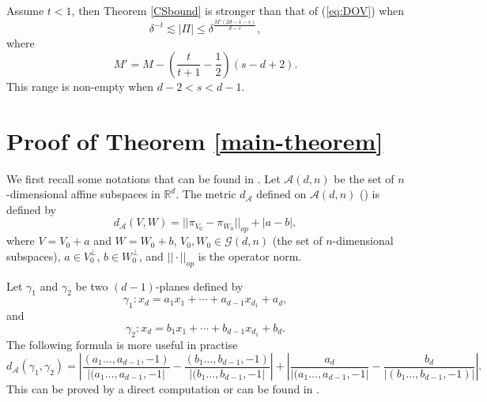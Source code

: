 \documentclass[11pt]{article}
\newcommand{\1}{\mathbf{1}}
\begin{document}
Assume $t<1$, then Theorem \ref{CSbound} is stronger than that of (\ref{eq:DOV}) when 
\[\delta^{-t}\lesssim |\Pi|\le \delta^{\frac{M'(2d-1-s)}{d-s}},\]
where 
\[M'=M-\left(\frac{t}{t+1}-\frac{1}{2}\right)(s-d+2).\]
This range is non-empty when $ d-2<s<d-1$.









\section{Proof of Theorem \ref{main-theorem}}
We first recall some notations that can be found in \cite{DOV}. Let $\mathcal{A}(d, n)$ be the set of $n$-dimensional affine subspaces in $\mathbb{R}^d$. The metric $d_{\mathcal{A}}$ defined on $\mathcal{A}(d, n)$ (\cite[page 53]{M95}) is defined by 
\[d_{\mathcal{A}}(V, W)=||\pi_{V_0}-\pi_{W_0}||_{op}+|a-b|,\]
where $V=V_0+a$ and $W=W_0+b$, $V_0, W_0\in \mathcal{G}(d, n)$ (the set of $n$-dimensional subspaces), $a\in V_0^\perp$, $b\in W_0^\perp$, and $||\cdot ||_{op}$ is the operator norm.

Let $\gamma_1$ and $\gamma_2$ be two $(d-1)$-planes defined by 
\[\gamma_1\colon x_d=a_1x_1+\cdots+a_{d-1}x_{d_1}+a_d,\]
and 
\[\gamma_2\colon x_d=b_1x_1+\cdots+b_{d-1}x_{d_1}+b_d.\]
The following formula is more useful in practise
\[d_\mathcal{A}\left(\gamma_1,\gamma_2\right) = \left|\dfrac{(a_1\ldots,a_{d-1},-1)}{\left|(a_1\ldots,a_{d-1},-1\right|}-\dfrac{(b_1\ldots,b_{d-1},-1)}{\left|(b_1\ldots,b_{d-1},-1\right|}\right|+\left|\dfrac{a_d}{\left|(a_1\ldots,a_{d-1},-1\right|}-\dfrac{b_d}{\left|(b_1\ldots,b_{d-1},-1)\right|}\right|.\]
This can be proved by a direct computation or can be found in \cite[Lemma 2.5]{HPab}. 
\end{document}
